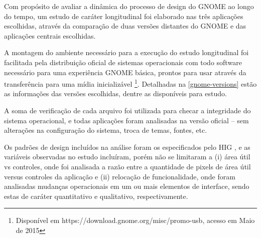 Com propósito de avaliar a dinâmica do processo de design do GNOME ao longo do
tempo, um estudo de caráter longitudinal foi elaborado nas três aplicações
escolhidas, através da comparação de duas versões distantes do GNOME e das
aplicações centrais escolhidas.

A montagem do ambiente necessário para a execução do estudo longitudinal foi
facilitada pela distribuição oficial de sistemas operacionais com todo software
necessário para uma experiência GNOME básica, prontos para usar através da
transferência para uma mídia inicializável \footnote{Disponível em
https://download.gnome.org/misc/promo-usb, acesso em Maio de 2015}. Detalhadas
na \autoref{gnome-versions} estão as informações das versões escolhidas, dentre
as disponíveis para estudo.

A soma de verificação de cada arquivo foi utilizada para checar a integridade do
sistema operacional, e todas aplicações foram analisadas na versão oficial --
sem alterações na configuração do sistema, troca de temas, fontes, etc.

\begin{table}[htb]
\end{table}

Os padrões de design incluídos na análise foram os especificados pelo HIG
\cite{hig314patterns}, e as variáveis observadas no estudo incluíram, porém não
se limitaram a (i) área útil vs controles, onde foi analisada a razão entre a
quantidade de pixels de área útil versus controles da aplicação e (ii) relocação
de funcionalidade, onde foram analisadas mudanças operacionais em um ou mais
elementos de interface, sendo estas de caráter quantitativo e qualitativo,
respectivamente.


